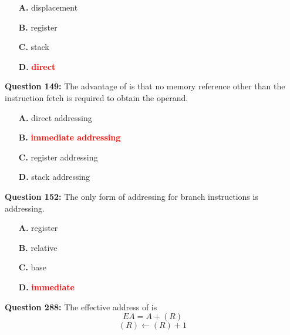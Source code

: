 \documentclass[12pt,a4paper]{article}
\begin{document}
\begin{itemize}
    \item[\textbf{A.}] displacement
    \item[\textbf{B.}] register
    \item[\textbf{C.}] stack
    \item[\textbf{D.}] \textcolor{red}{\textbf{direct}}
\end{itemize}

\vspace{0.5cm}

\vspace{0.5cm}

\textbf{Question 149:} The advantage of \underline{\hspace{1.5cm}} is that no memory reference other than the instruction fetch is required to obtain the operand.

\begin{itemize}
    \item[\textbf{A.}] direct addressing
    \item[\textbf{B.}] \textcolor{red}{\textbf{immediate addressing}}
    \item[\textbf{C.}] register addressing
    \item[\textbf{D.}] stack addressing
\end{itemize}

\vspace{0.5cm}

\vspace{0.5cm}

\textbf{Question 152:} The only form of addressing for branch instructions is \underline{\hspace{1.5cm}} addressing.

\begin{itemize}
    \item[\textbf{A.}] register
    \item[\textbf{B.}] relative
    \item[\textbf{C.}] base
    \item[\textbf{D.}] \textcolor{red}{\textbf{immediate}}
\end{itemize}

\vspace{0.5cm}

\vspace{0.5cm}

\textbf{Question 288:} The effective address of \underline{\hspace{1.5cm}} is
$$EA = A + (R)$$
$$(R) \leftarrow (R) + 1$$
\end{document}
